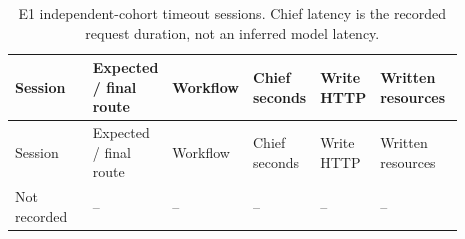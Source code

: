 \begingroup\small\setlength{\tabcolsep}{3pt}\renewcommand{\arraystretch}{1.15}
\begin{longtable}{>{\raggedright\arraybackslash}p{0.21\linewidth}>{\raggedright\arraybackslash}p{0.14\linewidth}>{\raggedright\arraybackslash}p{0.16\linewidth}>{\raggedright\arraybackslash}p{0.09\linewidth}>{\raggedright\arraybackslash}p{0.09\linewidth}>{\raggedright\arraybackslash}p{0.2\linewidth}}
\caption{E1 independent-cohort timeout sessions. Chief latency is the recorded request duration, not an inferred model latency.}\label{sup:e1timeout}\\\hline
Session & Expected / final route & Workflow & Chief seconds & Write HTTP & Written resources \\ \hline
\endfirsthead
\hline
Session & Expected / final route & Workflow & Chief seconds & Write HTTP & Written resources \\ \hline
\endhead
\hline\endfoot
\hline\endlastfoot
Not recorded & -- & -- & -- & -- & -- \\
\end{longtable}\endgroup

